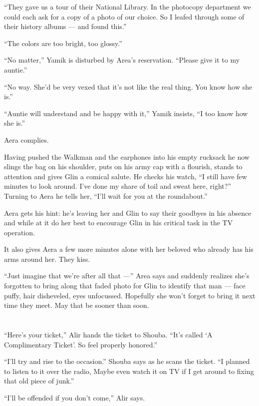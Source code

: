 \documentclass[twoside,11pt,openany]{book}
\begin{document}
``They gave us a tour of their National Library. In the photocopy department we could each ask for a copy
of a photo of our choice. So I leafed through some of their history albums --- and found this.''

``The colors are too bright, too glossy.''

``No matter,'' Yamik is disturbed by Area's reservation. ``Please give it to my
auntie.''

``No way. She'd be very vexed that it's not like the real thing. You know how she is.''

``Auntie will understand and be happy with it,'' Yamik insists, ``I too know how
she is.''

Aera complies.

Having pushed the Walkman and the earphones into his empty rucksack he now slings the bag on his shoulder, puts on his
army cap with a flourish, stands to attention and gives Glin a comical salute. He checks his watch, ``I
still have few minutes to look around. I've done my share of toil and sweat here, right?'' Turning to Aera
he tells her, ``I'll wait for you at the roundabout.''

Aera gets his hint: he's leaving her and Glin to say their goodbyes in his absence and while at it do her best to
encourage Glin in his critical task in the TV operation.

It also gives Aera a few more minutes alone with her beloved who already has his arms around her. They kiss.

``Just imagine that we're after all that ---'' Area says and suddenly realizes she's forgotten
to bring along that faded photo for Glin to identify that man --- face puffy, hair disheveled, eyes unfocussed. Hopefully
she won't forget to bring it next time they meet. May that be sooner than soon.



\chapter{}

``Here's your ticket,'' Alir hands the ticket to Shouba. ``It's called
`A Complimentary Ticket'. So feel properly honored.''

``I'll try and rise to the occasion.'' Shouba says as he scans the ticket. ``I
planned to listen to it over the radio, Maybe even watch it on TV if I get around to fixing that old piece
of junk.''

``I'll be offended if you don't come,'' Alir says.
\end{document}
